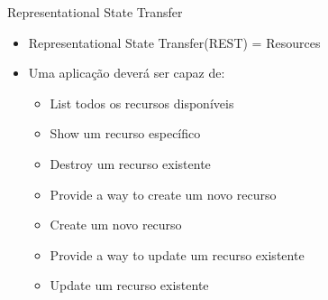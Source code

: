 \begin{frame}{Representational State Transfer}
	\begin{itemize}
		\item Representational State Transfer(REST) = Resources
		\item Uma aplicação deverá ser capaz de:
		\begin{itemize}
			\item \alert{List} todos os recursos disponíveis
			\item \alert{Show} um recurso específico
			\item \alert{Destroy} um recurso existente
			\item \alert{Provide a way to create} um novo recurso
			\item \alert{Create} um novo recurso
			\item \alert{Provide a way to update} um recurso existente
			\item \alert{Update} um recurso existente
		\end{itemize}		
	\end{itemize}	
\end{frame}